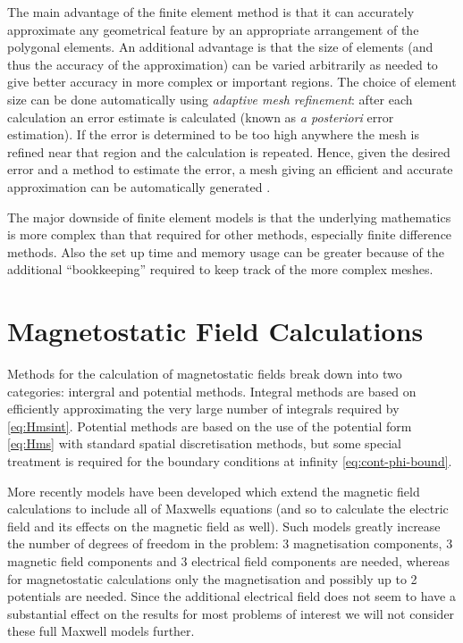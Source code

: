 The main advantage of the finite element method is that it can accurately approximate any geometrical feature by an appropriate arrangement of the polygonal elements.
An additional advantage is that the size of elements (and thus the accuracy of the approximation) can be varied arbitrarily as needed to give better accuracy in more complex or important regions. 
The choice of element size can be done automatically using \emph{adaptive mesh refinement}: after each calculation an error estimate is calculated (known as \emph{a posteriori} error estimation).
If the error is determined to be too high anywhere the mesh is refined near that region and the calculation is repeated.
Hence, given the desired error and a method to estimate the error, a mesh giving an efficient and accurate approximation can be automatically generated \cite{Schrefl1999}.

The major downside of finite element models is that the underlying mathematics is more complex than that required for other methods, especially finite difference methods.
Also the set up time and memory usage can be greater because of the additional ``bookkeeping'' required to keep track of the more complex meshes.


\section{Magnetostatic Field Calculations}
\label{sec:magn-field-calc}

Methods for the calculation of magnetostatic fields break down into two categories: intergral and potential methods.
Integral methods are based on efficiently approximating the very large number of integrals required by \cref{eq:Hmsint}.
Potential methods are based on the use of the potential form \cref{eq:Hms} with standard spatial discretisation methods, but some special treatment is required for the boundary conditions at infinity \cref{eq:cont-phi-bound}.

More recently models have been developed which extend the magnetic field calculations to include all of Maxwells equations (and so to calculate the electric field and its effects on the magnetic field as well).
Such models greatly increase the number of degrees of freedom in the problem: 3 magnetisation components, 3 magnetic field components and 3 electrical field components are needed, whereas for magnetostatic calculations only the magnetisation and possibly up to 2 potentials are needed.
Since the additional electrical field does not seem to have a substantial effect on the results for most problems of interest we will not consider these full Maxwell models further.

